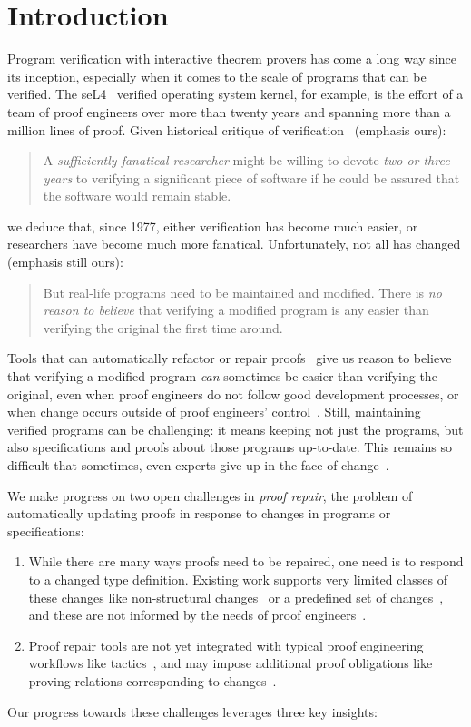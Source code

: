 \section{Introduction}

Program verification with interactive theorem provers has come a long way since its inception,
especially when it comes to the scale of programs that can be verified.
The seL4~\cite{Klein2009} verified operating system kernel, for example,
is the effort of a team of proof engineers over more than twenty years and spanning more than
a million lines of proof.
Given historical critique of verification~\cite{DeMillo1977} (emphasis ours):

\begin{quote}
A \textit{sufficiently fanatical researcher}
might be willing to devote \textit{two or 
three years} to verifying a significant 
piece of software if he could be 
assured that the software would remain stable.
\end{quote}
we deduce that, since 1977, either verification has become much easier,
or researchers have become much more fanatical. Unfortunately, not all has changed (emphasis still ours):

\begin{quote}
But real-life programs need to 
be maintained and modified. 
There is \textit{no reason to believe} that verifying a modified program is any 
easier than verifying the original the 
first time around.
\end{quote}
Tools that can automatically refactor or repair proofs~\cite{wibergh2019, WhitesidePhD, Dietrich2013, adams2015, Bourke12, Roe2016, robert2018, pumpkinpatch}
give us reason to believe that verifying a modified program \textit{can} sometimes be easier than verifying the original, even when proof engineers do not follow good development processes,
or when change occurs outside of proof engineers' control~\cite{PGL-045}.
Still, maintaining verified programs can be challenging: it means keeping not just the programs, but also specifications and proofs about those programs up-to-date.
This remains so difficult that sometimes, even experts give up in the face of change~\cite{replica}.

We make progress on two open challenges in \textit{proof repair}, the problem of automatically updating proofs in response
to changes in programs or specifications:

\begin{enumerate}
\item While there are many ways proofs need to be repaired, one need is to respond to a changed type definition.
Existing work supports very limited classes of these changes like non-structural changes~\cite{pumpkinpatch} or a predefined set
of changes~\cite{robert2018, wibergh2019}, and these are not informed by the needs of proof engineers~\cite{replica}.
\item Proof repair tools are not yet integrated with typical proof engineering workflows like tactics~\cite{PGL-045, pumpkinpatch, robert2018},
and may impose additional proof obligations like proving relations corresponding to changes~\cite{Ringer2019}.
\end{enumerate}
Our progress towards these challenges leverages three key insights:

